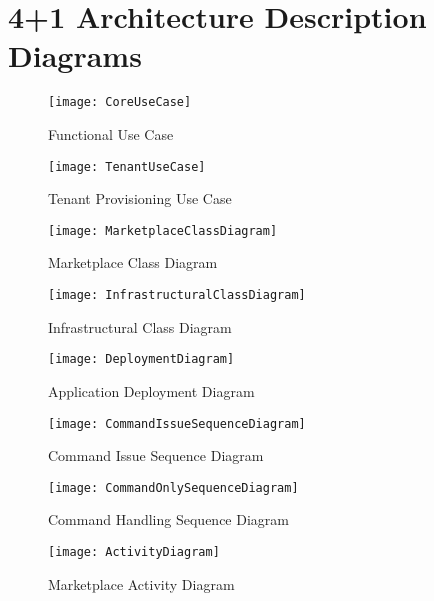 \chapter{4+1 Architecture Description Diagrams}
\label{appendix:ad}

\begin{figure}[htp]
\centering
\texttt{[image: CoreUseCase]}
\caption{Functional Use Case}
\label{fig:coreusecase}
\end{figure}

\begin{figure}[htp]
\centering
\texttt{[image: TenantUseCase]}
\caption{Tenant Provisioning Use Case}
\label{fig:tenantusecase}
\end{figure}


\begin{sidewaysfigure}[htp]
\centering
\texttt{[image: MarketplaceClassDiagram]}
\caption{Marketplace Class Diagram}
\label{fig:marketclass}
\end{sidewaysfigure}

\begin{sidewaysfigure}[htp]
\centering
\texttt{[image: InfrastructuralClassDiagram]}
\caption{Infrastructural Class Diagram}
\label{fig:infraclass}
\end{sidewaysfigure}


\begin{figure}[htp]
\centering
\texttt{[image: DeploymentDiagram]}
\caption{Application Deployment Diagram}
\label{fig:deploymentdiagram}
\end{figure}


\begin{figure}[htp]
\centering
\texttt{[image: CommandIssueSequenceDiagram]}
\caption{Command Issue Sequence Diagram}
\label{fig:commandissuesequencediagram}
\end{figure}

\begin{figure}[htp]
\centering
\texttt{[image: CommandOnlySequenceDiagram]}
\caption{Command Handling Sequence Diagram}
\label{fig:commandhandlesequencediagram}
\end{figure}

\begin{figure}[htp]
\centering
\texttt{[image: ActivityDiagram]}
\caption{Marketplace Activity Diagram}
\label{fig:activitydiagram}
\end{figure}

